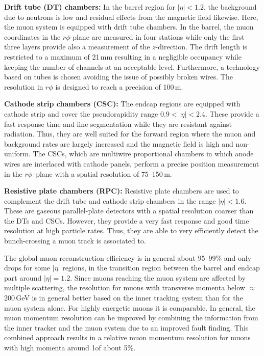 \begin{description}
 \item \textbf{Drift tube (DT) chambers:} In the barrel region for $|\eta| < 1.2$, the background due to neutrons is low and residual effects from the magnetic field likewise. Here, the muon system is equipped with drift tube chambers. In the barrel, the muon coordinates in the $r\phi$-plane are measured in four stations while only the first three layers provide also a measurement of the $z$-direction. The drift length is restricted to a maximum of 21\,mm resulting in a negligible occupancy while keeping the number of channels at an acceptable level. Furthermore, a technology based on tubes is chosen avoiding the issue of possibly broken wires. The resolution in $r\phi$ is designed to reach a precision of 100\,\textmu m.
 \item \textbf{Cathode strip chambers (CSC):} The endcap regions are equipped with cathode strip and cover the pseudorapidity range $0.9 < |\eta| < 2.4$. These provide a fast response time and fine segmentation while they are resistant against radiation. Thus, they are well suited for the forward region where the muon and background rates are largely increased and the magnetic field is high and non-uniform. The CSCs, which are multiwire proportional chambers in which anode wires are interlaced with cathode panels, perform a precise position measurement in the $r\phi$--plane with a spatial resolution of 75--150\,\textmu m. 
 \item \textbf{Resistive plate chambers (RPC):} Resistive plate chambers are used to complement the drift tube and cathode strip chambers in the range $|\eta| < 1.6$. These are gaseous parallel-plate detectors with a spatial resolution coarser than the DTs and CSCs. However, they provide a very fast response and good time resolution at high particle rates. Thus, they are able to very efficiently detect the bunch-crossing a muon track is associated to. 
\end{description}
The global muon reconstruction efficiency is in general about 95--99\% and only drops for some $|\eta|$ regions, \eg in the transition region between the barrel and endcap part around $|\eta|=1.2$. Since muons reaching the muon system are affected by multiple scattering, the resolution for muons with transverse momenta below $\approx$ 200\,GeV is in general better based on the inner tracking system than for the muon system alone. For highly energetic muons it is comparable. In general, the muon momentum resolution can be improved by combining the information from the inner tracker and the muon system due to an improved fault finding. This combined approach results in a relative muon momentum resolution for muons with high momenta around 1\tev of about 5\%.

